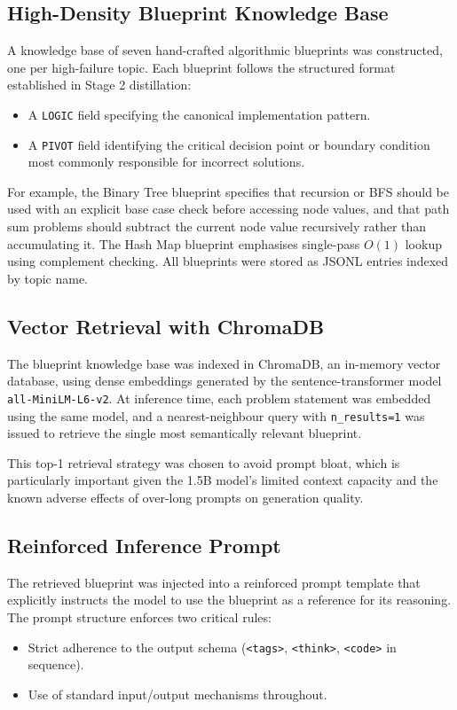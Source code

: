 \documentclass[12pt,a4paper]{article}
\begin{document}
\subsection{High-Density Blueprint Knowledge Base}

A knowledge base of seven hand-crafted algorithmic blueprints was constructed, one per high-failure topic. Each blueprint follows the structured format established in Stage 2 distillation:
\begin{itemize}
    \item A \texttt{LOGIC} field specifying the canonical implementation pattern.
    \item A \texttt{PIVOT} field identifying the critical decision point or boundary condition most commonly responsible for incorrect solutions.
\end{itemize}
For example, the Binary Tree blueprint specifies that recursion or BFS should be used with an explicit base case check before accessing node values, and that path sum problems should subtract the current node value recursively rather than accumulating it. The Hash Map blueprint emphasises single-pass $O(1)$ lookup using complement checking. All blueprints were stored as JSONL entries indexed by topic name.

\subsection{Vector Retrieval with ChromaDB}

The blueprint knowledge base was indexed in ChromaDB, an in-memory vector database, using dense embeddings generated by the sentence-transformer model \texttt{all-MiniLM-L6-v2}. At inference time, each problem statement was embedded using the same model, and a nearest-neighbour query with \texttt{n\_results=1} was issued to retrieve the single most semantically relevant blueprint.

This top-1 retrieval strategy was chosen to avoid prompt bloat, which is particularly important given the 1.5B model's limited context capacity and the known adverse effects of over-long prompts on generation quality.

\subsection{Reinforced Inference Prompt}

The retrieved blueprint was injected into a reinforced prompt template that explicitly instructs the model to use the blueprint as a reference for its reasoning. The prompt structure enforces two critical rules:
\begin{itemize}
    \item Strict adherence to the output schema (\texttt{<tags>}, \texttt{<think>}, \texttt{<code>} in sequence).
    \item Use of standard input/output mechanisms throughout.
\end{itemize}
\end{document}
